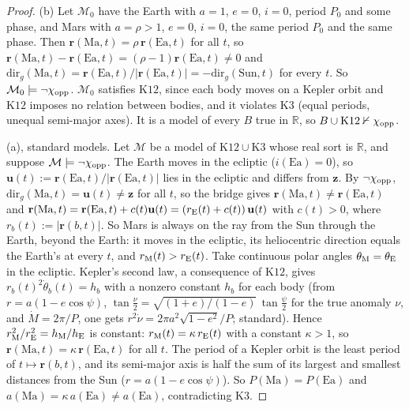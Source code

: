 \begin{proof}
(b) Let $\mathcal M_0$ have the Earth with $a=1$, $e=0$, $i=0$, period $P_0$ and some phase, and Mars with $a=\rho>1$, $e=0$, $i=0$, the same period $P_0$ and the same phase. Then $\mathbf r(\mathrm{Ma},t)=\rho\,\mathbf r(\mathrm{Ea},t)$ for all $t$, so $\mathbf r(\mathrm{Ma},t)-\mathbf r(\mathrm{Ea},t)=(\rho-1)\mathbf r(\mathrm{Ea},t)\ne0$ and $\mathrm{dir}_g(\mathrm{Ma},t)=\mathbf r(\mathrm{Ea},t)/\lvert\mathbf r(\mathrm{Ea},t)\rvert=-\mathrm{dir}_g(\mathrm{Sun},t)$ for every $t$. So $\mathcal M_0\models\neg\chi_{\rm opp}$. $\mathcal M_0$ satisfies $\mathrm{K12}$, since each body moves on a Kepler orbit and $\mathrm{K12}$ imposes no relation between bodies, and it violates $\mathrm{K3}$ (equal periods, unequal semi-major axes). It is a model of every $B$ true in $\mathbb R$, so $B\cup\mathrm{K12}\nvdash\chi_{\rm opp}$.

(a), standard models. Let $\mathcal M$ be a model of $\mathrm{K12}\cup\mathrm{K3}$ whose real sort is $\mathbb R$, and suppose $\mathcal M\models\neg\chi_{\rm opp}$. The Earth moves in the ecliptic ($i(\mathrm{Ea})=0$), so $\mathbf u(t):=\mathbf r(\mathrm{Ea},t)/\lvert\mathbf r(\mathrm{Ea},t)\rvert$ lies in the ecliptic and differs from $\mathbf z$. By $\neg\chi_{\rm opp}$, $\mathrm{dir}_g(\mathrm{Ma},t)=\mathbf u(t)\ne\mathbf z$ for all $t$, so the bridge gives $\mathbf r(\mathrm{Ma},t)\ne\mathbf r(\mathrm{Ea},t)$ and $\mathbf r(\mathrm{Ma},t)=\mathbf r(\mathrm{Ea},t)+c(t)\mathbf u(t)=(r_{\rm E}(t)+c(t))\,\mathbf u(t)$ with $c(t)>0$, where $r_b(t):=\lvert\mathbf r(b,t)\rvert$. So Mars is always on the ray from the Sun through the Earth, beyond the Earth: it moves in the ecliptic, its heliocentric direction equals the Earth's at every $t$, and $r_{\rm M}(t)>r_{\rm E}(t)$. Take continuous polar angles $\theta_{\rm M}=\theta_{\rm E}$ in the ecliptic. Kepler's second law, a consequence of $\mathrm{K12}$, gives $r_b(t)^2\dot\theta_b(t)=h_b$ with a nonzero constant $h_b$ for each body (from $r=a(1-e\cos\psi)$, $\tan\frac\nu2=\sqrt{(1+e)/(1-e)}\,\tan\frac\psi2$ for the true anomaly $\nu$, and $\dot M=2\pi/P$, one gets $r^2\dot\nu=2\pi a^2\sqrt{1-e^2}/P$; standard). Hence $r_{\rm M}^2/r_{\rm E}^2=h_{\rm M}/h_{\rm E}$ is constant: $r_{\rm M}(t)=\kappa\,r_{\rm E}(t)$ with a constant $\kappa>1$, so $\mathbf r(\mathrm{Ma},t)=\kappa\,\mathbf r(\mathrm{Ea},t)$ for all $t$. The period of a Kepler orbit is the least period of $t\mapsto\mathbf r(b,t)$, and its semi-major axis is half the sum of its largest and smallest distances from the Sun ($r=a(1-e\cos\psi)$). So $P(\mathrm{Ma})=P(\mathrm{Ea})$ and $a(\mathrm{Ma})=\kappa\,a(\mathrm{Ea})\ne a(\mathrm{Ea})$, contradicting $\mathrm{K3}$.


\end{proof}

